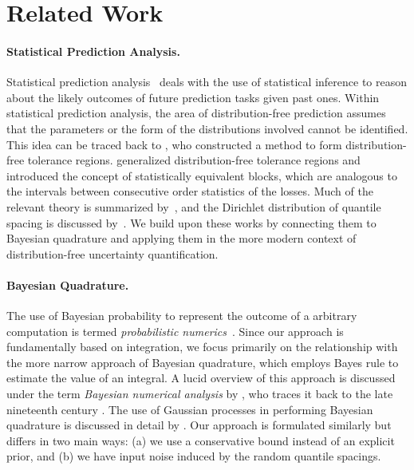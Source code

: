 \section{Related Work}
\paragraph{Statistical Prediction Analysis.} Statistical prediction analysis~\citep{aitchison1975statistical} deals with the use of statistical inference to reason about the likely outcomes of future prediction tasks given past ones. Within statistical prediction analysis, the area of distribution-free prediction assumes that the parameters or the form of the distributions involved cannot be identified. This idea can be traced back to \citet{wilks1941determination}, who constructed a method to form distribution-free tolerance regions. \citet{tukey1947nonparametric,tukey1948nonparametric} generalized distribution-free tolerance regions and introduced the concept of statistically equivalent blocks, which are analogous to the intervals between consecutive order statistics of the losses. Much of the relevant theory is summarized by~\citet{guttman1970statistical}, and the Dirichlet distribution of quantile spacing is discussed by~\citet{aitchison1975statistical}. We build upon these works by connecting them to Bayesian quadrature and applying them in the more modern context of distribution-free uncertainty quantification.

\paragraph{Bayesian Quadrature.} The use of Bayesian probability to represent the outcome of a arbitrary computation is termed \emph{probabilistic numerics}~\citep{cockayne2019bayesian,hennig2022probabilistic}. Since our approach is fundamentally based on integration, we focus primarily on the relationship with the more narrow approach of Bayesian quadrature, which employs Bayes rule to estimate the value of an integral. A lucid overview of this approach is discussed under the term \emph{Bayesian numerical analysis} by \citet{diaconis1988bayesian}, who traces it back to the late nineteenth century \citep{poincare1896calcul}. The use of Gaussian processes in performing Bayesian quadrature is discussed in detail by \citet{ohagan1991bayes}. Our approach is formulated similarly but differs in two main ways: (a) we use a conservative bound instead of an explicit prior, and (b) we have input noise induced by the random quantile spacings.

